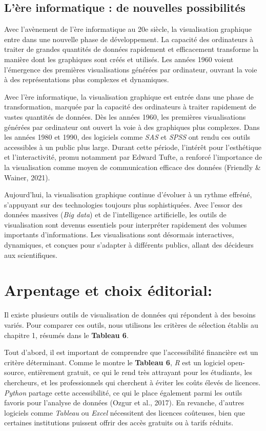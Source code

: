 \documentclass[
  letterpaper,
  DIV=11,
  numbers=noendperiod]{scrreprt}
\begin{document}
\subsection{L'ère informatique : de nouvelles
possibilités}\label{luxe8re-informatique-de-nouvelles-possibilituxe9s}

Avec l'avènement de l'ère informatique au 20e siècle, la visualisation
graphique entre dans une nouvelle phase de développement. La capacité
des ordinateurs à traiter de grandes quantités de données rapidement et
efficacement transforme la manière dont les graphiques sont créés et
utilisés. Les années 1960 voient l'émergence des premières
visualisations générées par ordinateur, ouvrant la voie à des
représentations plus complexes et dynamiques.

Avec l'ère informatique, la visualisation graphique est entrée dans une
phase de transformation, marquée par la capacité des ordinateurs à
traiter rapidement de vastes quantités de données. Dès les années 1960,
les premières visualisations générées par ordinateur ont ouvert la voie
à des graphiques plus complexes. Dans les années 1980 et 1990, des
logiciels comme \emph{SAS} et \emph{SPSS} ont rendu ces outils
accessibles à un public plus large. Durant cette période, l'intérêt pour
l'esthétique et l'interactivité, promu notamment par Edward Tufte, a
renforcé l'importance de la visualisation comme moyen de communication
efficace des données (Friendly \& Wainer, 2021).

Aujourd'hui, la visualisation graphique continue d'évoluer à un rythme
effréné, s'appuyant sur des technologies toujours plus sophistiquées.
Avec l'essor des données massives (\emph{Big data}) et de l'intelligence
artificielle, les outils de visualisation sont devenus essentiels pour
interpréter rapidement des volumes importants d'informations. Les
visualisations sont désormais interactives, dynamiques, et conçues pour
s'adapter à différents publics, allant des décideurs aux scientifiques.

\section{Arpentage et choix
éditorial:}\label{arpentage-et-choix-uxe9ditorial}

Il existe plusieurs outils de visualisation de données qui répondent à
des besoins variés. Pour comparer ces outils, nous utilisons les
critères de sélection établis au chapitre 1, résumés dans le
\textbf{Tableau 6}.

Tout d'abord, il est important de comprendre que l'accessibilité
financière est un critère déterminant. Comme le montre le
\textbf{Tableau 6}, \emph{R} est un logiciel open-source, entièrement
gratuit, ce qui le rend très attrayant pour les étudiants, les
chercheurs, et les professionnels qui cherchent à éviter les coûts
élevés de licences. \emph{Python} partage cette accessibilité, ce qui le
place également parmi les outils favoris pour l'analyse de données
(Ozgur et al., 2017). En revanche, d'autres logiciels comme
\emph{Tableau} ou \emph{Excel} nécessitent des licences coûteuses, bien
que certaines institutions puissent offrir des accès gratuits ou à
tarifs réduits.
\end{document}
